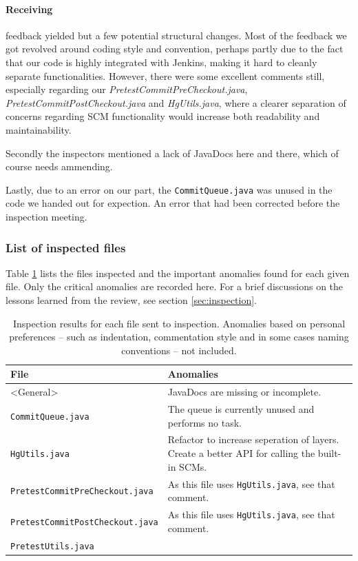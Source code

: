 \documentclass[a4paper,11pt]{article}
\begin{document}
\paragraph{Receiving} feedback yielded but a few potential structural changes. Most
of the feedback we got revolved around coding style and convention, perhaps
partly due to the fact that our code is highly integrated with Jenkins, making
it hard to cleanly separate functionalities. However, there were some excellent
comments still, especially regarding our
{\it PretestCommitPreCheckout.java},
{\it PretestCommitPostCheckout.java}
and
{\it HgUtils.java},
where a
clearer separation of concerns regarding SCM functionality would increase both
readability and maintainability.

Secondly the inspectors mentioned a lack of JavaDocs here and there, which of
course needs ammending.

Lastly, due to an error on our part, the {\tt CommitQueue.java} was unused in
the code we handed out for expection. An error that had been corrected before
the inspection meeting.

\subsubsection{List of inspected files}
Table \ref{tab:inspection} lists the files inspected and the important anomalies
found for each given file. Only the critical anomalies are recorded here. For a
brief discussions on the lessons learned from the review, see section
\ref{sec:inspection}.

\begin{table}[!ht]
	\centering
	\begin{tabular}{| p{6cm} | p{5cm} |}
			\hline
			\textbf{File}&\textbf{Anomalies} \\
			\hline
			<General> & JavaDocs are missing or incomplete. \\
			\hline
			\texttt{CommitQueue.java} &
				The queue is currently unused and performs no task.\\
			\hline
			\texttt{HgUtils.java} &
				Refactor to increase seperation of layers. Create a better API
				for calling the built-in SCMs.\\
			\hline
			\texttt{PretestCommitPreCheckout.java} &
				As this file uses \texttt{HgUtils.java}, see that comment. \\
			\hline
			\texttt{PretestCommitPostCheckout.java} &
				As this file uses \texttt{HgUtils.java}, see that comment. \\
			\hline
			\texttt{PretestUtils.java} & \\
			\hline
		\end{tabular}
		\caption{Inspection results for each file sent to inspection. Anomalies based
		on personal preferences -- such as indentation, commentation style and in some
		cases naming conventions -- not included.}
		\label{tab:inspection}
\end{table}
\end{document}

